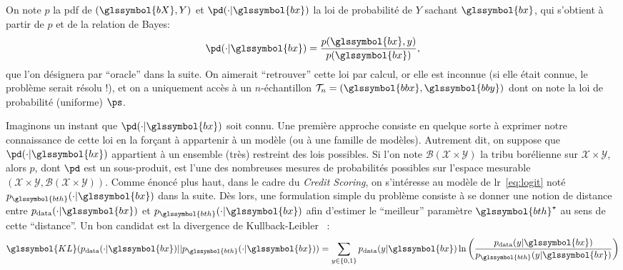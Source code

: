 On note $p$ la \gls{pdf} de $(\glssymbol{bX},Y)$ et $\pd(\cdot | \glssymbol{bx})$ la loi de probabilité de $Y$ sachant $\glssymbol{bx}$, qui s'obtient à partir de $p$ et de la relation de Bayes: $$\pd(\cdot | \glssymbol{bx}) = \frac{p(\glssymbol{bx},y)}{p(\glssymbol{bx})},$$ que l'on désignera par ``oracle'' dans la suite. On aimerait ``retrouver'' cette loi par calcul, or elle est inconnue (si elle était connue, le problème serait résolu !), et on a uniquement accès à un $n$-échantillon $\mathcal{T}_n = (\glssymbol{bbx},\glssymbol{bby})$ dont on note la loi de probabilité (uniforme) $\ps$.

Imaginons un instant que $\pd(\cdot | \glssymbol{bx})$ soit connu. Une première approche consiste en quelque sorte à exprimer notre connaissance de cette loi en la forçant à appartenir à un modèle (ou à une famille de modèles). Autrement dit, on suppose que $\pd(\cdot | \glssymbol{bx})$ appartient à un ensemble (très) restreint des lois possibles. Si l'on note $\mathcal{B}(\mathcal{X} \times \mathcal{Y})$ la tribu borélienne sur $\mathcal{X} \times \mathcal{Y}$, alors $p$, dont $\pd$ est un sous-produit, est l'une des nombreuses mesures de probabilités possibles sur l'espace mesurable $(\mathcal{X} \times \mathcal{Y},\mathcal{B}(\mathcal{X} \times \mathcal{Y}))$. Comme énoncé plus haut, dans le cadre du \textit{Credit Scoring}, on s'intéresse au modèle de \gls{lr}~\eqref{eq:logit} noté $p_{\glssymbol{bth}}(\cdot | \glssymbol{bx})$ dans la suite. Dès lors, une formulation simple du problème consiste à se donner une notion de distance entre $p_{\text{data}}(\cdot | \glssymbol{bx})$ et $p_{\glssymbol{bth}}(\cdot | \glssymbol{bx})$ afin d'estimer le ``meilleur'' paramètre $\glssymbol{bth}^\star$ au sens de cette ``distance''. Un bon candidat est la divergence de Kullback-Leibler~\cite{kullback1951information} :
\begin{equation} \label{eq:KL}
\glssymbol{KL}(p_{\text{data}}(\cdot | \glssymbol{bx})||p_{\glssymbol{bth}}(\cdot | \glssymbol{bx})) = \sum_{y \in \{0,1\}} p_{\text{data}}(y | \glssymbol{bx}) \ln \left( \frac{p_{\text{data}}(y | \glssymbol{bx})}{p_{\glssymbol{bth}}(y | \glssymbol{bx})} \right)
\end{equation}
